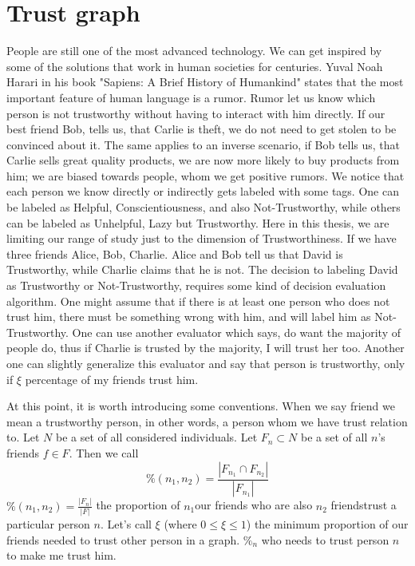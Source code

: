 \chapter{Trust graph}
\label{trust-graph}

People are still one of the most advanced technology. We can get inspired by some of the solutions that work in human societies for centuries.
Yuval Noah Harari in his book "Sapiens: A Brief History of Humankind" \cite{harari2014sapiens} states that the most important feature of human language is a rumor. Rumor let us know which person is not trustworthy without having to interact with him directly. If our best friend Bob, tells us, that Carlie is theft, we do not need to get stolen to be convinced about it. The same applies to an inverse scenario, if Bob tells us, that Carlie sells great quality products, we are now more likely to buy products from him; we are biased towards people, whom we get positive rumors. We notice that each person we know directly or indirectly gets labeled with some tags. One can be labeled as Helpful, Conscientiousness, and also Not-Trustworthy, while others can be labeled as Unhelpful, Lazy but Trustworthy. Here in this thesis, we are limiting our range of study just to the dimension of Trustworthiness.
If we have three friends Alice, Bob, Charlie. Alice and  Bob tell us that David is Trustworthy, while Charlie claims that he is not. The decision to labeling David as Trustworthy or Not-Trustworthy, requires some kind of decision evaluation algorithm.
One might assume that if there is at least one person who does not trust him, there must be something wrong with him, and will label him as Not-Trustworthy. One can use another evaluator which says, do want the majority of people do, thus if Charlie is trusted by the majority, I will trust her too. Another one can slightly generalize this evaluator and say that person is trustworthy, only if $\xi$ percentage of my friends trust him. 

At this point, it is worth introducing some conventions. When we say friend we mean a trustworthy person, in other words, a person whom we have trust relation to. Let $N$ be a set of all considered individuals. Let $F_n \subset N$ be a set of all $n$'s friends $f \in F$. Then we call 
\begin{equation}
\%(n_1, n_2) = \frac{|F_{n_1} \cap F_{n_2}|}{|F_{n_1}|}    
\end{equation}
$\%(n_1, n_2) = \frac{|F_n|}{|F|}$ the proportion of $n_1$our friends who are also $n_2$ friendstrust a particular person $n$. Let's call $\xi$ (where $0 \le \xi \leq 1$) the minimum proportion of our friends needed to trust other person in a graph. $\%_n$ who needs to trust person $n$ to make me trust him. 

